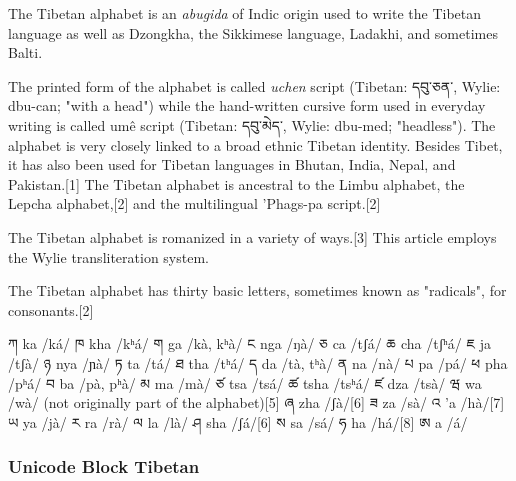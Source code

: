 The Tibetan alphabet is an \emph{abugida} of Indic origin used to write the Tibetan language as well as Dzongkha, the Sikkimese language, Ladakhi, and sometimes Balti. 

The printed form of the alphabet is called \textit{uchen} script (Tibetan: དབུ་ཅན་, Wylie: dbu-can; "with a head") while the hand-written cursive form used in everyday writing is called umê script (Tibetan: དབུ་མེད་, Wylie: dbu-med; "headless").
\uccoff
The alphabet is very closely linked to a broad ethnic Tibetan identity. Besides Tibet, it has also been used for Tibetan languages in Bhutan, India, Nepal, and Pakistan.[1] The Tibetan alphabet is ancestral to the Limbu alphabet, the Lepcha alphabet,[2] and the multilingual 'Phags-pa script.[2]
\uccon

The Tibetan alphabet is romanized in a variety of ways.[3] This article employs the Wylie transliteration system.

The Tibetan alphabet has thirty basic letters, sometimes known as "radicals", for consonants.[2]

ཀ ka /ká/	ཁ kha /kʰá/	ག ga /kà, kʰà/	ང nga /ŋà/
ཅ ca /tʃá/	ཆ cha /tʃʰá/	ཇ ja /tʃà/	ཉ nya /ɲà/
ཏ ta /tá/	ཐ tha /tʰá/	ད da /tà, tʰà/	ན na /nà/
པ pa /pá/	ཕ pha /pʰá/	བ ba /pà, pʰà/	མ ma /mà/
ཙ tsa /tsá/	ཚ tsha /tsʰá/	ཛ dza /tsà/	ཝ wa /wà/ (not originally part of the alphabet)[5]
ཞ zha /ʃà/[6]	ཟ za /sà/	འ 'a /hà/[7]
ཡ ya /jà/	ར ra /rà/	ལ la /là/
ཤ sha /ʃá/[6]	ས sa /sá/	ཧ ha /há/[8]
ཨ a /á/

\subsubsection{Unicode Block Tibetan}


